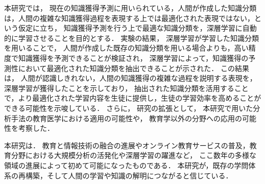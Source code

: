 本研究では，
現在の知識獲得予測に用いられている，人間が作成した知識分類は，人間の複雑な知識獲得過程を表現する上では最適化された表現ではない，という仮定に立ち，
知識獲得予測を行う上で最適な知識分類を，深層学習に自動的に学習させることを目的とする．
実験の結果，
深層学習が学習した知識分類を用いることで，
人間が作成した既存の知識分類を用いる場合よりも，高い精度で知識獲得を予測できることが検証され，
深層学習によって，知識獲得の予測性において最適化された知識分類を抽出できることが示された．
この結果は，
人間が認識しきれない，人間の知識獲得の複雑な過程を説明する表現を，深層学習が獲得したことを示しており，
抽出された知識分類を活用することで，より最適化された学習内容を生徒に提供し，生徒の学習効率を高めることができる可能性を示唆している．
さらに，
研究の拡張として，
本研究で用いた分析手法の教育医学における適用の可能性や，
教育学以外の分野への応用の可能性を考察した．


本研究は．
教育と情報技術の融合の進展やオンライン教育サービスの普及，教育分野における大規模分析の活発化や深層学習の躍進など，
ここ数年の多様な領域の進展によって初めて可能になったものである．
本研究が，既存の学問体系の再構築，そして人間の学習や知識の解明につながると信じている．
